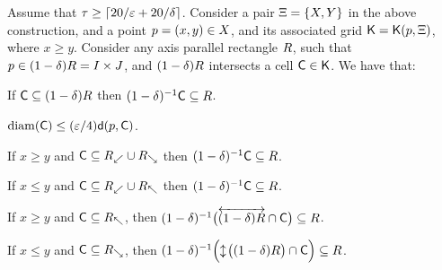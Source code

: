 \documentclass[12pt]{article}%
\begin{document}
\begin{lemma}
    Assume that $\tau \geq \left\lceil {20/\varepsilon+ 20/\delta} \right\rceil$.  Consider a
    pair $\Xi = \{X, Y \}$ in the above construction, and a
    point $p =(x,y) \in X$, and its associated grid
    $\mathsf{K} = \mathsf{K}(p, \Xi)$, where $x \geq y$. Consider any axis
    parallel rectangle $R$, such that
    $p \in (1-\delta)R = I\times J$, and $(1-\delta)R$
    intersects a cell $\mathsf{C} \in \mathsf{K}$. We have that:
    \begin{compactenumI}
        \smallskip%
        \item {} If $\mathsf{C} \subseteq (1-\delta)R$ then
        $(1-\delta)^{-1} \mathsf{C} \subseteq R$.

        \item {}
        $\diameterX{\cell} \leq (\eps/4) \dsY{\pa}{\cell}$.

        \item {} If $x \geq y$ and
        $\mathsf{C} \subseteq R_\swarrow \cup R_\searrow$ then
        $(1-\delta)^{-1} \mathsf{C} \subseteq R$.

        \item {} If $x \leq y$ and
        $\mathsf{C} \subseteq R_\swarrow \cup R_\nwarrow$ then
        $(1-\delta)^{-1} \mathsf{C} \subseteq R$.

        \smallskip%
        \item {} If $x \geq y$ and
        $\mathsf{C} \subseteq R_\nwarrow$, then
        $(1-\delta)^{-1} \bigl(\overleftrightarrow{ (1-\delta)R} \cap \mathsf{C}
        \bigr) \subseteq R$.

        \smallskip%
        \item {} If $x \leq y$ and
        $\mathsf{C} \subseteq R_\searrow$, then
        $(1-\delta)^{-1} \Bigl(\updownarrow\!{\bigl( (1-\delta)R \bigr)}
        \cap \mathsf{C} \Bigr) \subseteq R$.
    \end{compactenumI}
\end{lemma}
\end{document}
